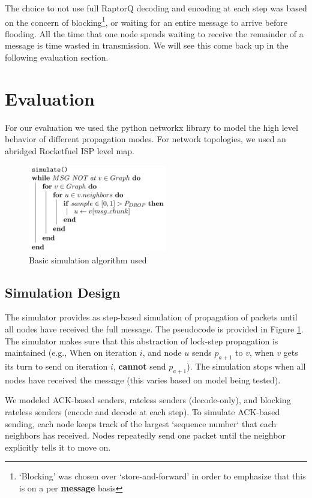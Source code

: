 The choice to not use full RaptorQ decoding and encoding at each step was based on the concern of blocking\footnote{`Blocking' was chosen over `store-and-forward' in order to emphasize that this is on a per \textbf{message} basis}, or waiting for an entire message to arrive before flooding. All the time that one node spends waiting to receive the remainder of a message is time wasted in transmission. We will see this come back up in the following evaluation section.

\section{Evaluation}
For our evaluation we used the python networkx library to model the high level behavior of different propagation modes.\cite{nwx}
For network topologies, we used an abridged Rocketfuel ISP level map. \cite{rocketfuel}

\begin{figure}[tp]
\centering
\includegraphics[width=6cm]{figures/algo_v2.png}
\caption{Basic simulation algorithm used}
\label{algo:a1}
\end{figure}

\subsection{Simulation Design}
The simulator provides as step-based simulation of propagation of packets until all nodes have received the full message. The pseudocode is provided in Figure \ref{algo:a1}. The simulator makes sure that this abstraction of lock-step propagation is maintained (e.g., When on iteration $i$, and node $u$ sends $p_{a+1}$ to $v$, when $v$ gets its turn to send on iteration $i$, \textbf{cannot} send $p_{a+1}$). The simulation stops when all nodes have received the message (this varies based on model being tested). 

We modeled ACK-based senders, rateless senders (decode-only), and blocking rateless senders (encode and decode at each step). To simulate ACK-based sending, each node keeps track of the largest `sequence number` that each neighbors has received. Nodes repeatedly send one packet until the neighbor explicitly tells it to move on. 

